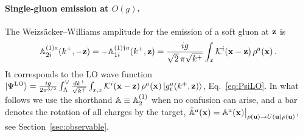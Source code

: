 \paragraph{Single-gluon emission at $O(g)$.} The Weizs\"acker--Williams amplitude for the emission of a soft gluon at $\mathbf{z}$ is
\begin{align}\label{eq:A1}
\mathbb{A}^{(1)a}_{2i}(k^+,-\mathbf{z})=-\mathbb{A}^{(1)\dagger a}_{1i}(k^+,\mathbf{z})=\frac{ig}{\sqrt2\,\pi\sqrt{k^+}}\int_x\mathcal{K}^i(\mathbf{x}-\mathbf{z})\,\rho^a(\mathbf{x})\,.
\end{align}
It corresponds to the LO wave function $\ket{\Psi^{\rm LO}}=\frac{ig}{2\pi^{3/2}}\int_\Lambda^\vee\frac{dk^+}{\sqrt{k^+}}\int_{x,z}\mathcal{K}^i(\mathbf{x}-\mathbf{z})\,\rho^a(\mathbf{x})\ket{g^a_i(k^+,\mathbf{z})}$, Eq.~\eqref{eq:PsiLO}. In what follows we use the shorthand $\mathbb{A}\equiv\mathbb{A}^{(1)}_2$ when no confusion can arise, and a bar denotes the rotation of all charges by the target, $\bar{\mathbb{A}}^a(\mathbf{x})=\mathbb{A}^a(\mathbf{x})\big|_{\rho(\mathbf{u})\to U(\mathbf{u})\rho(\mathbf{u})}$, see Section~\ref{sec:observable}.

